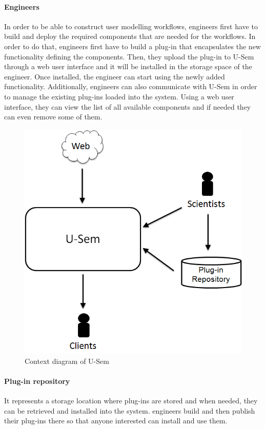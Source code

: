 \paragraph{Engineers}
In order to be able to construct user modelling workflows, engineers first have to build and deploy the required components that are needed for the workflows. In order to do that, engineers first have to build a plug-in that encapsulates the new functionality defining the components. Then, they upload the plug-in to U-Sem through a web user interface and it will be installed in the storage space of the engineer. Once installed, the engineer can start using the newly added functionality. Additionally, engineers can also communicate with U-Sem in order to manage the existing plug-ins loaded into the system. Using a web user interface, they can view the list of all available components and if needed they can even remove some of them.

\begin{figure}[h!]
  \centering
  	\includegraphics[scale=0.5]{plug-in/environment/runtime_env.png}
  \caption{Context diagram of U-Sem }
  \label{fig_context}
\end{figure}

\paragraph{Plug-in repository}
It represents a storage location where plug-ins are stored and when needed, they can be retrieved and installed into the system. engineers build and then publish their plug-ins there so that anyone interested can install and use them. 


